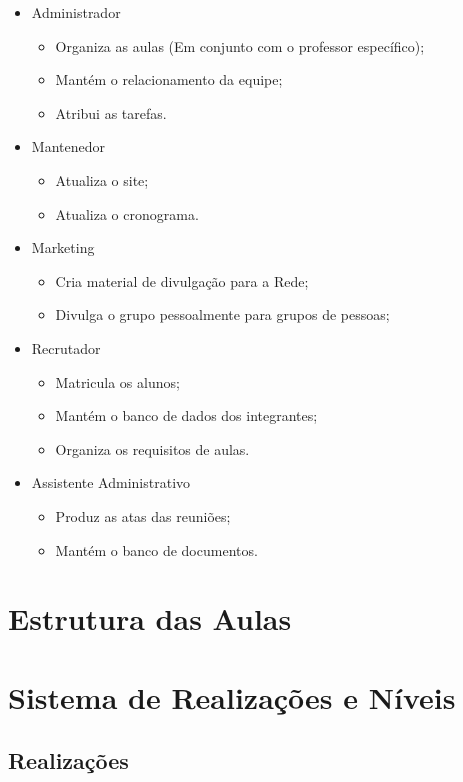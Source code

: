 \documentclass[a4paper,11pt]{report}
\numberwithin{equation}{section}
\begin{document}
\begin{itemize}
  \item Administrador
  \begin{itemize}
    \item Organiza as aulas (Em conjunto com o professor específico);
    \item Mantém o relacionamento da equipe;
    \item Atribui as tarefas.
  \end{itemize}
  \item Mantenedor
  \begin{itemize}
    \item Atualiza o site;
    \item Atualiza o cronograma.
  \end{itemize}
  \item Marketing
  \begin{itemize}
    \item Cria material de divulgação para a Rede;
    \item Divulga o grupo pessoalmente para grupos de pessoas;
  \end{itemize}
  \item Recrutador
  \begin{itemize}
    \item Matricula os alunos;
    \item Mantém o banco de dados dos integrantes;
    \item Organiza os requisitos de aulas.
  \end{itemize}
  \item Assistente Administrativo
  \begin{itemize}
    \item Produz as atas das reuniões;
    \item Mantém o banco de documentos.
  \end{itemize}
\end{itemize}

\chapter{Estrutura das Aulas}

\chapter{Sistema de Realizações e Níveis}

\section{ Realizações }
\end{document}
